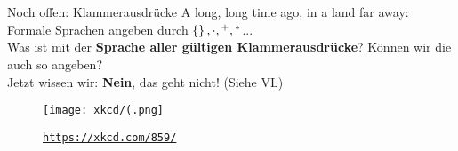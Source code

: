 




\section{}
\begin{frame}{Noch offen: Klammerausdrücke}
	A long, long time ago, in a land far away:\\
	\medskip
	Formale Sprachen angeben durch $\left\{\right\}, \cdot, {}^+, {}^*$...\\
	Was ist mit der \textbf{Sprache aller gültigen Klammerausdrücke}? Können wir die auch so angeben?\\[1em]
	\pause
	\impl Jetzt wissen wir: \textbf{Nein}, das geht nicht! (Siehe VL)\\[1em]
	
	\begin{figure}[H]
		\centering
		\texttt{[image: xkcd/(.png]}
		\vspace{-7pt}
		\caption{ \texttt{\url{https://xkcd.com/859/}} }
	\end{figure}
\end{frame}


